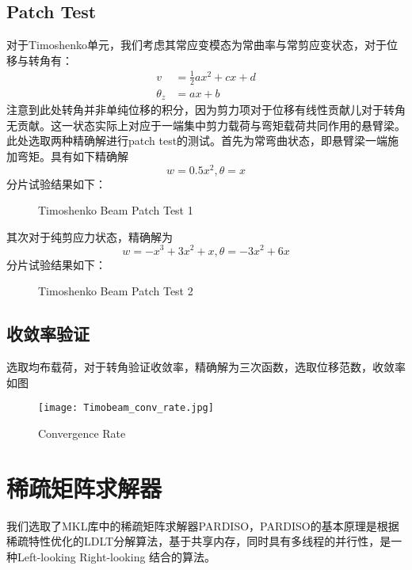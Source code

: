\documentclass[forprint]{WHUBachelor}
\begin{document}
\subsection{Patch Test}
对于Timoshenko单元，我们考虑其常应变模态为常曲率与常剪应变状态，对于位移与转角有：
\begin{equation} 
\begin{aligned} v &=\frac{1}{2} a x^{2}+c x+d \\ \theta_{z} &=a x+b \end{aligned}
 \end{equation}
注意到此处转角并非单纯位移的积分，因为剪力项对于位移有线性贡献儿对于转角无贡献。这一状态实际上对应于一端集中剪力载荷与弯矩载荷共同作用的悬臂梁。此处选取两种精确解进行patch test的测试。首先为常弯曲状态，即悬臂梁一端施加弯矩。具有如下精确解
\begin{equation} 
w=0.5x^{2}, \theta= x
 \end{equation}
分片试验结果如下：
\begin{figure}[H]
\centering
  \hfill
  \hfill

  \caption{Timoshenko Beam Patch Test 1}\label{fig:2}
\end{figure}
其次对于纯剪应力状态，精确解为
\begin{equation} 
w=-x^3+3x^{2}+x, \theta= -3x^2+6x
 \end{equation}
分片试验结果如下：
\begin{figure}[H]
\centering
  \hfill
  \hfill

  \caption{Timoshenko Beam Patch Test 2}\label{fig:2}
\end{figure}

\subsection{收敛率验证}
选取均布载荷，对于转角验证收敛率，精确解为三次函数，选取位移范数，收敛率如图
\begin{figure}[H]
\centering
    \texttt{[image: Timobeam\_conv\_rate.jpg]}
  \caption{Convergence Rate}
\end{figure}
\section{稀疏矩阵求解器}
我们选取了MKL库中的稀疏矩阵求解器PARDISO，PARDISO的基本原理是根据稀疏特性优化的LDLT分解算法，基于共享内存，同时具有多线程的并行性，是一种Left-looking Right-looking 结合的算法。
\end{document}
